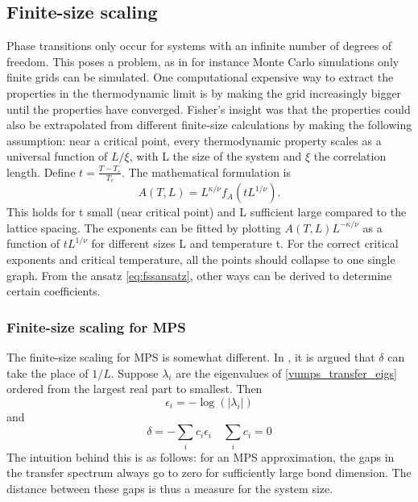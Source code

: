 \subsection{Finite-size scaling}\label{subsec:fss}

Phase transitions only occur for systems with an infinite number of degrees of freedom. This poses a problem, as in for instance Monte Carlo simulations only finite grids can be simulated. One computational expensive way to extract the properties in the thermodynamic limit is by making the grid increasingly bigger until the properties have converged. Fisher's  insight was that the properties could also be extrapolated from different finite-size calculations by making the following assumption: near a critical point, every thermodynamic property scales as a universal function of $L/\xi$, with L the size of the system and $\xi$ the correlation length.
Define $t=\frac{T-T_c}{T_c}$. The mathematical formulation is
\begin{equation}\label{eq:fssansatz}
    A(T,L) = L^{\kappa / \nu} f_A( t L ^{1/ \nu} ).
\end{equation}
This holds for t small (near critical point) and L sufficient large compared to the lattice spacing. The exponents can be fitted by plotting $A(T,L)  L^{-\kappa / \nu} $ as a function of $t L ^{1/ \nu}$ for different sizes L and temperature t. For the correct critical exponents and critical temperature, all the points should collapse to one single graph. From the ansatz \cref{eq:fssansatz}, other ways can be derived to determine certain coefficients.


\subsubsection{Finite-size scaling for \Gls{MPS}}

The finite-size scaling for \Gls{MPS} is somewhat different. In \cite{Vanhecke2019}, it is argued that $\delta$ can take the place of $1/L$. Suppose $\lambda_i$ are the eigenvalues of \cref{vumps_transfer_eigs} ordered from the largest real part to smallest. Then
\begin{equation}
    \epsilon_i = - \log( \left | \lambda_i  \right |  )
\end{equation}
and
\begin{equation} \label{eq:cit_delta}
    \delta = - \sum_i c_i \epsilon_i  \quad \sum_i c_i = 0
\end{equation}
The intuition behind this is as follows: for an \Gls{MPS} approximation, the gaps in the transfer spectrum always go to zero for sufficiently large bond dimension. The distance between these gaps is thus a measure for the system size.

